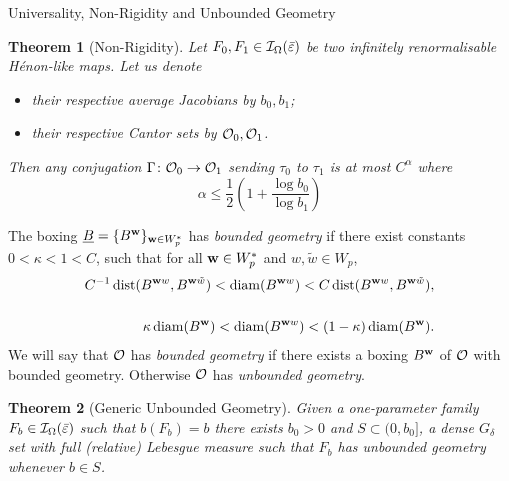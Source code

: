 \documentclass[final,hyperref={pdfpagelabels=false}]{beamer}
\theoremstyle{plain}%
\newtheorem{thm}{Theorem}
\theoremstyle{definition}
\theoremstyle{remark}
\begin{document}
\begin{frame}{}
\begin{columns}[t]
\begin{column}{0.3\linewidth}
\begin{block}{Universality, Non-Rigidity and Unbounded Geometry}
\begin{thm}[Non-Rigidity]
Let $F_0, F_1\in \mathcal I_{\Omega}(\bar{\varepsilon})$ be two infinitely renormalisable H\'enon-like maps. Let us denote 
\begin{itemize}
\item their respective average Jacobians by $b_0, b_1$; 
\item their respective Cantor sets by $\mathcal O_0, \mathcal O_1$.
\end{itemize}
Then  any conjugation $\Gamma\colon \mathcal O_0\to\mathcal O_1$ sending $\tau_0$ to $\tau_1$ is at most $C^{\alpha}$ where
\begin{equation}
\alpha\leq \frac{1}{2}\left(1+\frac{\log b_0}{\log b_1}\right)
\end{equation}
\end{thm}
The boxing $\uline{B}=\{B^{\word{w}{}}\}_{\word{w}{}\in W_p^*}$ has \emph{bounded geometry} if there exist constants $0<\kappa<1<C$, such that for all $\mathbf{w}\in W_p^*$ and
$w,\tilde{w}\in W_p$,
\begin{align*}
C^{-1}\operatorname{\mathrm{dist}}(B^{\mathbf{w}w},B^{\mathbf{w}\tilde{w}})
<\operatorname{\mathrm{diam}}(B^{\mathbf{w}w})<
C\operatorname{\mathrm{dist}}(B^{\mathbf{w}w},B^{\mathbf{w}\tilde{w}}), \\
 \notag \\
\kappa\operatorname{\mathrm{diam}}(B^{\mathbf{w}})<\operatorname{\mathrm{diam}}(B^{\mathbf{w}w})<(1-\kappa)\operatorname{\mathrm{diam}}(B^{\mathbf{w}}).
\end{align*}
We will say that $\mathcal O$ has \emph{bounded geometry} if there exists a boxing $B^{\mathbf{w}}$ of $\mathcal O$ with bounded geometry. Otherwise $\mathcal O$ has \emph{unbounded geometry}.

\vskip 10pt

\begin{thm}[Generic Unbounded Geometry]
Given a one-parameter family $F_b\in\mathcal I_{\Omega}(\bar{\varepsilon})$ such that $b(F_b)=b$ there exists $b_0>0$ and $S\subset (0,b_0]$, a dense $G_\delta$ set with full (relative) Lebesgue measure such that $F_b$ has unbounded geometry whenever $b\in S$.
\end{thm}

\end{block}
\end{column}
\end{columns}
\end{frame}
\end{document}
